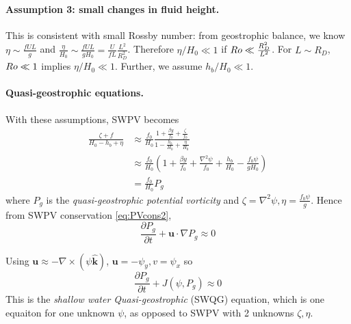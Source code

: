 \documentclass{jknotes}
\begin{document}
\paragraph{Assumption 3: small changes in fluid height.}
This is consistent with small Rossby number: from geostrophic balance, we know
$\eta \sim \frac{f UL}{g}$ and $\frac{\eta}{H_0} \sim \frac{fUL}{gH_0} =
\frac{U}{fL} \frac{L^2}{R_D^2}$. Therefore $\eta/H_0 \ll 1$ if $Ro \ll
\frac{R^2_D}{L^2}$. For $L \sim R_D$, $Ro \ll 1$ implies $\eta/H_0 \ll 1$.
Further, we assume $h_b/H_0 \ll 1$. 

\paragraph{Quasi-geostrophic equations.} With these assumptions, SWPV becomes
\begin{align}
	\frac{\zeta + f}{H_0 - h_b + \eta} &\approx \frac{f_0}{H_0} \frac{1+
		\frac{\beta y}{f_0} + \frac{\zeta}{f_0}}{1 - \frac{h_b}{H_0} +
	\frac{\eta}{H_0}} \\
	&\approx \frac{f_0}{H_0} \left(1+\frac{\beta y}{f_0} + \frac{\nabla^2
\psi}{f_0} + \frac{h_b}{H_0} - \frac{f_0 \psi}{g H_0}\right) \\
&= \frac{f_0}{H_0} P_g
\end{align}
where $P_g$ is the \emph{quasi-geostrophic potential vorticity} and $\zeta =
\nabla^2 \psi, \eta = \frac{f_0 \psi}{g}$. Hence from SWPV conservation
\eqref{eq:PVcons2},
\begin{equation}
	\frac{\partial P_g}{\partial t} + \symbf{u} \cdot \nabla P_g \approx 0
\end{equation}

Using $\symbf{u} \approx - \nabla \times (\psi \hat{\symbf{k}})$, $\symbf{u} = -\psi_y,
v = \psi_x$ so
\begin{equation}
	\frac{\partial P_g}{\partial t} + J(\psi,P_g) \approx 0\label{eq:swqg}
\end{equation}
This is the \emph{shallow water Quasi-geostrophic} (SWQG) equation, which is
one equaiton for one unknown $\psi$, as opposed to SWPV with 2 unknowns
$\zeta, \eta$.
\end{document}
